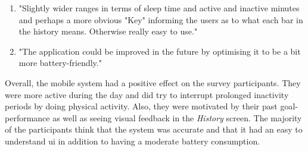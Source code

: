 \begin{itemize}
\begin{enumerate}
        \item "Slightly wider ranges in terms of sleep time and active and inactive minutes and perhaps a more obvious "Key" informing the users as to what each bar in the history means. Otherwise really easy to use."
        \item "The application could be improved in the future by optimising it to be a bit more battery-friendly."
    \end{enumerate}
\end{itemize}

Overall, the mobile system had a positive effect on the survey participants. They were more active during the day and did try to interrupt prolonged inactivity periods by doing physical activity. Also, they were motivated by their past goal-performance as well as seeing visual feedback in the \textit{History} screen. The majority of the participants think that the system was accurate and that it had an easy to understand \gls{ui} in addition to having a moderate battery consumption. 

